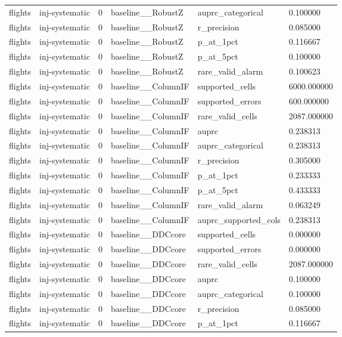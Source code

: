 \begin{tabular}{llllll}
flights & inj-systematic & 0 & baseline\_\_RobustZ & auprc\_categorical & 0.100000 \\
flights & inj-systematic & 0 & baseline\_\_RobustZ & r\_precision & 0.085000 \\
flights & inj-systematic & 0 & baseline\_\_RobustZ & p\_at\_1pct & 0.116667 \\
flights & inj-systematic & 0 & baseline\_\_RobustZ & p\_at\_5pct & 0.100000 \\
flights & inj-systematic & 0 & baseline\_\_RobustZ & rare\_valid\_alarm & 0.100623 \\
flights & inj-systematic & 0 & baseline\_\_ColumnIF & supported\_cells & 6000.000000 \\
flights & inj-systematic & 0 & baseline\_\_ColumnIF & supported\_errors & 600.000000 \\
flights & inj-systematic & 0 & baseline\_\_ColumnIF & rare\_valid\_cells & 2087.000000 \\
flights & inj-systematic & 0 & baseline\_\_ColumnIF & auprc & 0.238313 \\
flights & inj-systematic & 0 & baseline\_\_ColumnIF & auprc\_categorical & 0.238313 \\
flights & inj-systematic & 0 & baseline\_\_ColumnIF & r\_precision & 0.305000 \\
flights & inj-systematic & 0 & baseline\_\_ColumnIF & p\_at\_1pct & 0.233333 \\
flights & inj-systematic & 0 & baseline\_\_ColumnIF & p\_at\_5pct & 0.433333 \\
flights & inj-systematic & 0 & baseline\_\_ColumnIF & rare\_valid\_alarm & 0.063249 \\
flights & inj-systematic & 0 & baseline\_\_ColumnIF & auprc\_supported\_cols & 0.238313 \\
flights & inj-systematic & 0 & baseline\_\_DDCcore & supported\_cells & 0.000000 \\
flights & inj-systematic & 0 & baseline\_\_DDCcore & supported\_errors & 0.000000 \\
flights & inj-systematic & 0 & baseline\_\_DDCcore & rare\_valid\_cells & 2087.000000 \\
flights & inj-systematic & 0 & baseline\_\_DDCcore & auprc & 0.100000 \\
flights & inj-systematic & 0 & baseline\_\_DDCcore & auprc\_categorical & 0.100000 \\
flights & inj-systematic & 0 & baseline\_\_DDCcore & r\_precision & 0.085000 \\
flights & inj-systematic & 0 & baseline\_\_DDCcore & p\_at\_1pct & 0.116667 \\

\end{tabular}
